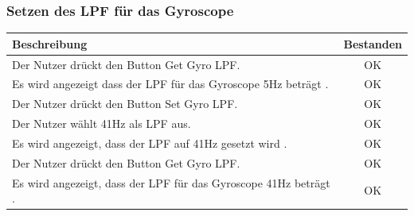 \documentclass[a4paper,12pt]{article}
\newcommand{\testok}[0]{
	\cellcolor{green!25} OK
}
\begin{document}
\subsubsection{Setzen des LPF für das Gyroscope}
\begin{tabular}{ | p{12cm} | c| }
	\hline
	\textbf{Beschreibung} & \textbf{Bestanden}\\
	\hline
	Der Nutzer drückt den Button \glqq Get Gyro LPF\grqq{}. & \testok \\
	\hline
	Es wird angezeigt dass der LPF für das Gyroscope 5Hz beträgt . & \testok \\
	\hline
	Der Nutzer drückt den Button \glqq Set Gyro LPF\grqq{}. & \testok \\
	\hline
	Der Nutzer wählt 41Hz als LPF aus. & \testok \\
	\hline
	Es wird angezeigt, dass der LPF auf 41Hz gesetzt wird . & \testok \\
	\hline
	Der Nutzer drückt den Button \glqq Get Gyro LPF\grqq{}. & \testok \\
	\hline
	Es wird angezeigt, dass der LPF für das Gyroscope 41Hz beträgt . & \testok \\
	\hline
\end{tabular}
\\ \\ \\ \\
\begin{figure}[h]
	\centering
\end{figure}
\FloatBarrier
\end{document}
